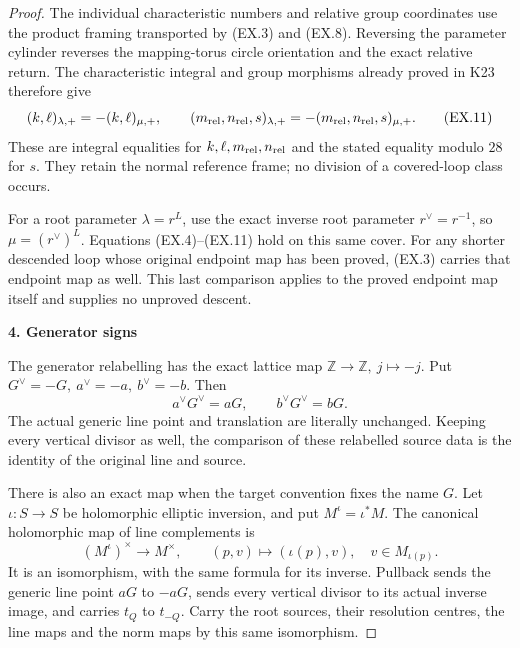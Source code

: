 \begin{proof}
The individual characteristic numbers and relative group
coordinates use the product framing transported by (EX.3)
and (EX.8). Reversing the parameter cylinder reverses the
mapping-torus circle orientation and the exact relative
return. The characteristic integral and group morphisms
already proved in K23 therefore give
\[
 (k,\ell)_{\lambda,+}=-(k,\ell)_{\mu,+},\qquad
 (m_{\rm rel},n_{\rm rel},s)_{\lambda,+}
       =-(m_{\rm rel},n_{\rm rel},s)_{\mu,+}.
 \tag{EX.11}
\]
These are integral equalities for \(k,\ell,m_{\rm rel},n_{\rm rel}\)
and the stated equality modulo \(28\) for \(s\).
They retain the normal reference frame; no division of a
covered-loop class occurs.

For a root parameter \(\lambda=r^L\), use the exact inverse
root parameter \(r^\vee=r^{-1}\), so
\(\mu=(r^\vee)^L\). Equations (EX.4)--(EX.11) hold on this
same cover. For any shorter descended loop whose original
endpoint map has been proved, (EX.3) carries that endpoint
map as well. This last comparison applies to the proved
endpoint map itself and supplies no unproved descent.

\par

\medskip\noindent\textbf{4. Generator signs}

\par\nobreak

The generator relabelling has the exact lattice map
\(\mathbb Z\to\mathbb Z,\ j\mapsto-j\). Put
\(G^\vee=-G,\ a^\vee=-a,\ b^\vee=-b\). Then
\[
 a^\vee G^\vee=aG,\qquad b^\vee G^\vee=bG.
 \tag{EX.12}
\]
The actual generic line point and translation are literally
unchanged. Keeping every vertical divisor as well, the
comparison of these relabelled source data is the identity
of the original line and source.

There is also an exact map when the target convention fixes
the name \(G\). Let \(\iota:S\to S\) be holomorphic elliptic
inversion, and put \(M^\iota=\iota^*M\). The canonical
holomorphic map of line complements is
\[
 (M^\iota)^\times\longrightarrow M^\times,\qquad
 (p,v)\longmapsto(\iota(p),v),
 \quad v\in M_{\iota(p)}.
 \tag{EX.13}
\]
It is an isomorphism, with the same formula for its inverse.
Pullback sends the generic line point \(aG\) to \(-aG\),
sends every vertical divisor to its actual inverse image,
and carries \(t_Q\) to \(t_{-Q}\). Carry the root sources,
their resolution centres, the line maps and the norm maps
by this same isomorphism.


\end{proof}
